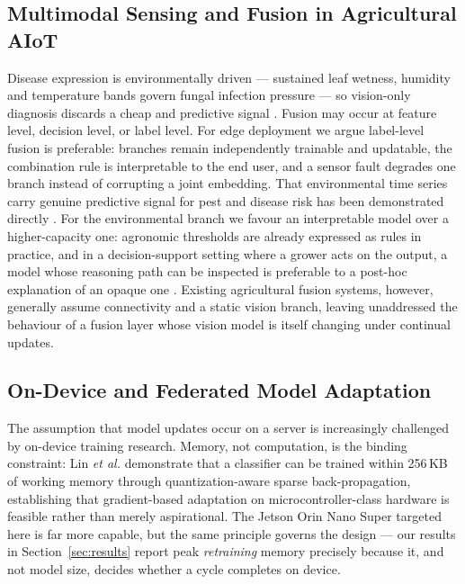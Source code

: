\documentclass[journal]{IEEEtran}
\begin{document}
\subsection{Multimodal Sensing and Fusion in Agricultural AIoT}

Disease expression is environmentally driven --- sustained leaf wetness, humidity
and temperature bands govern fungal infection pressure --- so vision-only diagnosis
discards a cheap and predictive signal \cite{ref25}. Fusion may occur at feature
level, decision level, or label level. For edge deployment we argue label-level
fusion is preferable: branches remain independently trainable and updatable, the
combination rule is interpretable to the end user, and a sensor fault degrades one
branch instead of corrupting a joint embedding. That environmental time series carry
genuine predictive signal for pest and disease risk has been demonstrated directly
\cite{ref26}. For the environmental branch we favour an interpretable model over a
higher-capacity one: agronomic thresholds are already expressed as rules in practice,
and in a decision-support setting where a grower acts on the output, a model whose
reasoning path can be inspected is preferable to a post-hoc explanation of an opaque
one \cite{ref28}.
Existing agricultural fusion systems, however, generally assume connectivity and a
static vision branch, leaving unaddressed the behaviour of a fusion layer whose
vision model is itself changing under continual updates.

\subsection{On-Device and Federated Model Adaptation}

The assumption that model updates occur on a server is increasingly challenged by
on-device training research. Memory, not computation, is the binding constraint:
Lin \emph{et al.} \cite{ref30} demonstrate that a classifier can be trained within
256\,KB of working memory through quantization-aware sparse back-propagation,
establishing that gradient-based adaptation on microcontroller-class hardware is
feasible rather than merely aspirational. The Jetson Orin Nano Super targeted here is
far
more capable, but the same principle governs the design --- our results in
Section~\ref{sec:results} report peak \emph{retraining} memory precisely because it,
and not model size, decides whether a cycle completes on device.
\end{document}
